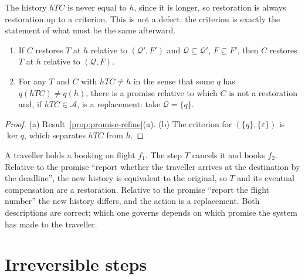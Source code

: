 The history $hTC$ is never equal to $h$, since it is longer, so restoration is always restoration up to a criterion. This is not a defect: the criterion is exactly the statement of what must be the same afterward.

\begin{newresult}\label{prop:restore-monotone}
\begin{enumerate}[nosep,label=(\alph*)]
  \item If $C$ restores $T$ at $h$ relative to $(\mathcal Q',F')$ and $\mathcal Q\subseteq\mathcal Q'$, $F\subseteq F'$, then $C$ restores $T$ at $h$ relative to $(\mathcal Q,F)$.
  \item For any $T$ and $C$ with $hTC\ne h$ in the sense that some $q$ has $q(hTC)\ne q(h)$, there is a promise relative to which $C$ is not a restoration and, if $hTC\in\mathcal A$, is a replacement: take $\mathcal Q=\{q\}$.
\end{enumerate}
\end{newresult}
\begin{proof}
(a) Result~\ref{prop:promise-refine}(a). (b) The criterion for $(\{q\},\{\varepsilon\})$ is $\ker q$, which separates $hTC$ from $h$.
\end{proof}

\begin{example}[Rebooking]
A traveller holds a booking on flight $f_1$. The step $T$ cancels it and books $f_2$. Relative to the promise ``report whether the traveller arrives at the destination by the deadline'', the new history is equivalent to the original, so $T$ and its eventual compensation are a restoration. Relative to the promise ``report the flight number'' the new history differs, and the action is a replacement. Both descriptions are correct; which one governs depends on which promise the system has made to the traveller.
\end{example}

\section{Irreversible steps}

